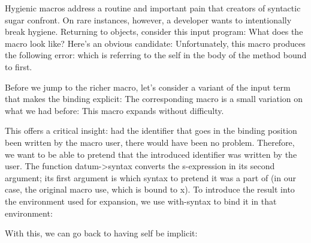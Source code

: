 
Hygienic macros address a routine and important pain that creators of syntactic
sugar confront. On rare instances, however, a developer wants to intentionally
break hygiene. Returning to objects, consider this input program:
What does the macro look like? Here’s an obvious candidate:
Unfortunately, this macro produces the following error:
which is referring to the self in the body of the method bound to first.


Before we jump to the richer macro, let’s consider a variant of the input term
that makes the binding explicit:
The corresponding macro is a small variation on what we had before:
This macro expands without difficulty.


This offers a critical insight: had the identifier that goes in the binding
position been written by the macro user, there would have been no problem.
Therefore, we want to be able to pretend that the introduced identifier was
written by the user. The function datum->syntax converts the s-expression in its
second argument; its first argument is which syntax to pretend it was a part of
(in our case, the original macro use, which is bound to x). To introduce the
result into the environment used for expansion, we use with-syntax to bind it in
that environment:

With this, we can go back to having self be implicit:

